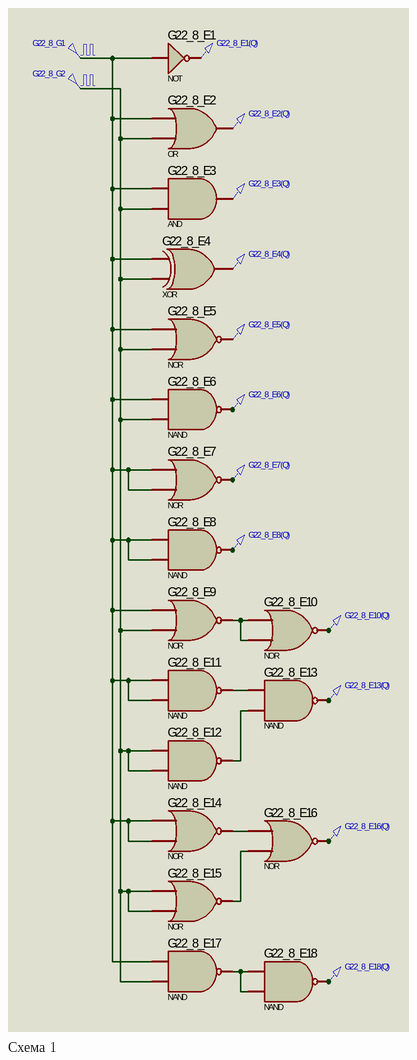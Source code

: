 \documentclass{article}
\begin{document}
\begin{normalsize}
	\begin{figure}[H]
		\centering
		\includegraphics[scale=0.36]{s1}	
		\caption{Схема 1}
	\end{figure}


\end{normalsize}
\end{document}

